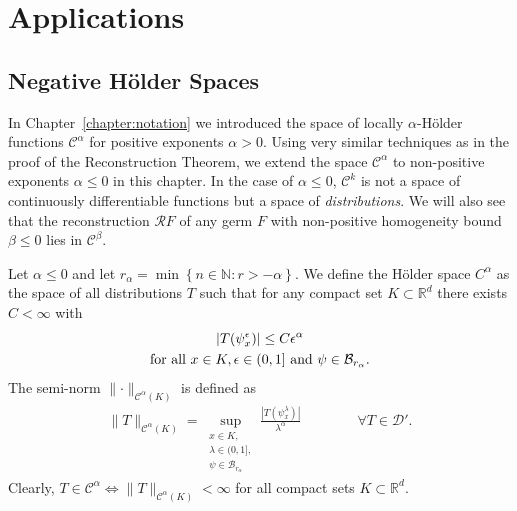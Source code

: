 \chapter{Applications}

\section{Negative Hölder Spaces}

In Chapter~\ref{chapter:notation} we introduced the space of locally \( \alpha  \)-Hölder functions \( \mathcal{C}^\alpha \) for positive exponents \( \alpha > 0 \). Using very similar techniques as in the proof of the Reconstruction Theorem, we extend the space \( \mathcal{C}^\alpha \) to non-positive exponents \( \alpha \leq 0 \) in this chapter. In the case of \( \alpha \leq 0 \), \( \mathcal{C}^k \) is not a space of continuously differentiable functions but a space of \emph{distributions}. We will also see that the reconstruction \( \mathcal{R}F \) of any germ \( F \) with non-positive homogeneity bound \( \beta \leq 0 \) lies in \( \mathcal{C}^\beta \).

\begin{definition}
  Let \( \alpha \leq 0 \) and let \( r_\alpha = \min\left\{ n \in \mathbb{N} : r > -\alpha \right\} \). We define the Hölder space \( C^\alpha \) as the space of all distributions \( T \) such that for any compact set \( K \subset \mathbb{R}^d \) there exists \( C < \infty \) with 
  \begin{gather}
    |T(\psi^\epsilon_x)| \leq C \epsilon^\alpha \label{eq:negative-hoelder-spaces} \\
    \text{for all \(x \in K,  \epsilon \in (0,1] \) and \( \psi \in \mathcal{B}_{r_\alpha} \)}. \nonumber 
  \end{gather}
  The semi-norm \( \lVert \cdot \rVert_{\mathcal{C}^\alpha(K)} \) is defined as 
  \begin{align*}
    \lVert T \rVert_{\mathcal{C}^\alpha(K)} 
    = \sup_{
      \substack{
        x \in K,\\
        \lambda \in (0,1],\\
        \psi \in \mathcal{B}_{r_\alpha}
      }
    } \frac{|T(\psi^\lambda_x)|}{\lambda^\alpha} \hspace{4em} \forall T \in \mathcal{D}'.
  \end{align*}
  Clearly, \( T \in \mathcal{C}^\alpha \iff \lVert T \rVert_{\mathcal{C}^\alpha(K)} < \infty \) for all compact sets \( K \subset \mathbb{R}^d \).
\end{definition}

